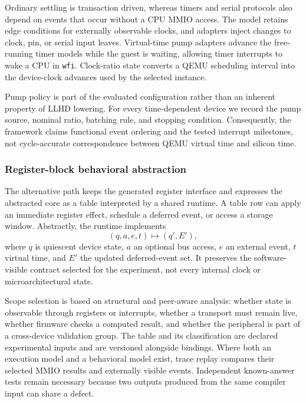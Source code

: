 Ordinary settling is transaction driven, whereas timers and serial protocols
also depend on events that occur without a CPU MMIO access.  The model retains
edge conditions for externally observable clocks, and adapters inject changes
to clock, pin, or serial input leaves.  Virtual-time pump adapters advance the
free-running timer models while the guest is waiting, allowing timer interrupts
to wake a CPU in \texttt{wfi}.  Clock-ratio state converts a QEMU scheduling
interval into the device-clock advances used by the selected instance.

Pump policy is part of the evaluated configuration rather than an inherent
property of LLHD lowering.  For every time-dependent device we record the pump
source, nominal ratio, batching rule, and stopping condition.  Consequently, the
framework claims functional event ordering and the tested interrupt milestones,
not cycle-accurate correspondence between QEMU virtual time and silicon time.

\subsubsection{Register-block behavioral abstraction}

The alternative path keeps the generated register interface and expresses the
abstracted core as a table interpreted by a shared runtime.  A table row can
apply an immediate register effect, schedule a deferred event, or access a
storage window.  Abstractly, the runtime implements
\begin{equation}
  (q,a,e,t) \longmapsto (q',E'),
\end{equation}
where $q$ is quiescent device state, $a$ an optional bus access, $e$ an external
event, $t$ virtual time, and $E'$ the updated deferred-event set.  It preserves
the software-visible contract selected for the experiment, not every internal
clock or microarchitectural state.

Scope selection is based on structural and peer-aware analysis: whether state is
observable through registers or interrupts, whether a transport must remain
live, whether firmware checks a computed result, and whether the peripheral is
part of a cross-device validation group.  The table and its classification are
declared experimental inputs and are versioned alongside bindings.  Where both
an execution model and a behavioral model exist, trace replay compares their
selected MMIO results and externally visible events.  Independent known-answer
tests remain necessary because two outputs produced from the same compiler input
can share a defect.

